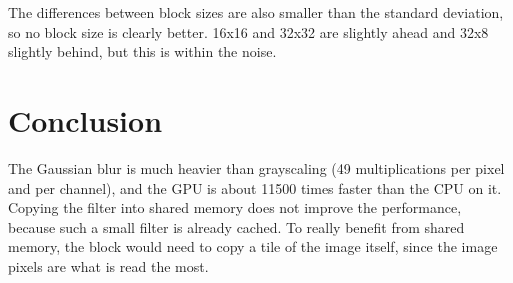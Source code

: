 \documentclass{report}
\begin{document}
The differences between block sizes are also smaller than the standard deviation, so no block size is clearly better. 16x16 and 32x32 are slightly ahead and 32x8 slightly behind, but this is within the noise.

\section*{Conclusion}

The Gaussian blur is much heavier than grayscaling (49 multiplications per pixel and per channel), and the GPU is about 11500 times faster than the CPU on it. Copying the filter into shared memory does not improve the performance, because such a small filter is already cached. To really benefit from shared memory, the block would need to copy a tile of the image itself, since the image pixels are what is read the most.
\end{document}
